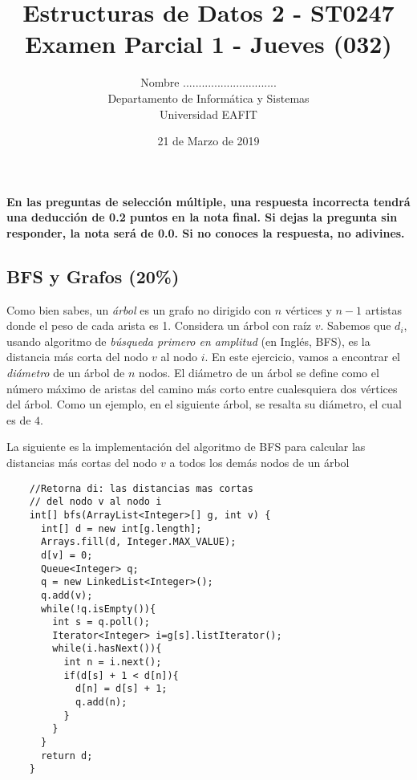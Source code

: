 \documentclass[10 pt]{article}
\title{\textbf {Estructuras de Datos 2 - ST0247\\Examen Parcial 1 - Jueves (032)
}}
\author{Nombre ..............................\\
		Departamento de Informática y Sistemas\\
		Universidad EAFIT\\}
\date{21 de Marzo de 2019}
\begin{document}
\lstset{escapechar=@,style=customc, numbers=left, stepnumber = 1} 
\maketitle

\textbf{En las preguntas de selección múltiple, una respuesta incorrecta tendrá
una deducción de 0.2 puntos en la nota final. Si dejas la pregunta sin
responder, la nota será de 0.0. Si no conoces la respuesta, no adivines.}

\begin{multicols}{2}

	\section{BFS y Grafos (20\%)}
	Como bien sabes, un \emph{árbol} es un grafo no dirigido con $n$ vértices y $n - 1$ artistas donde el peso de cada arista es 1. Considera un árbol con raíz $v$. Sabemos que $d_i$, usando algoritmo de \emph{búsqueda primero en amplitud} (en Inglés, BFS), es la distancia más corta  del nodo $v$ al nodo $i$. En este ejercicio, vamos a encontrar el \textit{diámetro} de un árbol de $n$ nodos. El diámetro de un árbol se define como el número máximo de aristas del camino más corto entre cualesquiera dos vértices del árbol. Como un ejemplo, en el siguiente árbol, se resalta su diámetro, el cual es de $4$.
	\\
	\begin{center}
	\end{center}

La siguiente es la implementación del algoritmo de BFS para calcular las
	distancias más cortas del nodo $v$ a todos los demás nodos de un árbol
	{\footnotesize
	\begin{lstlisting}
	//Retorna di: las distancias mas cortas
	// del nodo v al nodo i
	int[] bfs(ArrayList<Integer>[] g, int v) {
	  int[] d = new int[g.length];
	  Arrays.fill(d, Integer.MAX_VALUE);
	  d[v] = 0;
	  Queue<Integer> q;
	  q = new LinkedList<Integer>();
	  q.add(v);
	  while(!q.isEmpty()){
	  	int s = q.poll();
	  	Iterator<Integer> i=g[s].listIterator();
	  	while(i.hasNext()){
	  	  int n = i.next();
	  	  if(d[s] + 1 < d[n]){
	  	    d[n] = d[s] + 1;
	  	    q.add(n);
	  	  }
	  	}
	  }
	  return d;
	}
	\end{lstlisting}
	}


\end{multicols}
\end{document}
